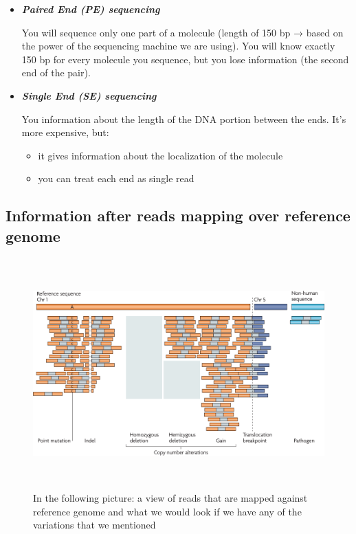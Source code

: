 \begin{itemize}
  \item \textit{\textbf{Paired End (PE) sequencing}}

  You will sequence only one part of a molecule (length of 150 bp → based on the
  power of the sequencing machine we are using). You will know exactly 150 bp
  for every molecule you sequence, but you lose information (the second end of
  the pair).

  \item \textit{\textbf{Single End (SE) sequencing}}
  
  You information about the length of the DNA portion between the ends. It's
  more expensive, but:

  \begin{itemize}
    \item
      it gives information about the localization of the molecule
    \item
      you can treat each end as single read
    \end{itemize}

\end{itemize}


\subsection{Information after reads mapping over reference genome}

\begin{figure}[H]
  \includegraphics[width=6.16003in,height=3.4875in]{image13.png}
  \centering
  \caption{In the following picture: a view of reads that are mapped against
  reference genome and what we would look if we have any of the variations that
  we mentioned}
\end{figure}

